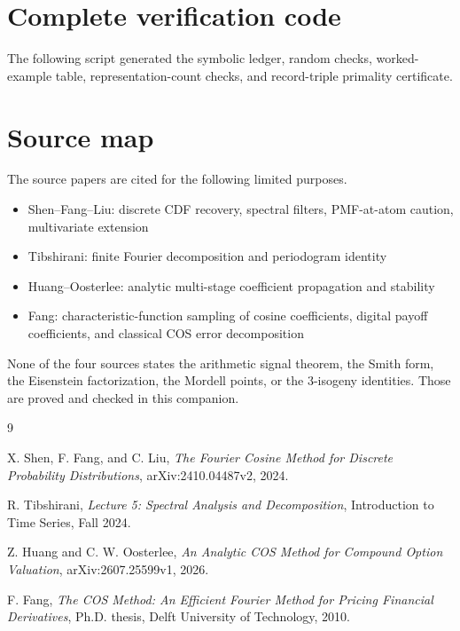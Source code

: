 \documentclass[11pt]{article}
\begin{document}
\section{Complete verification code}

The following script generated the symbolic ledger, random checks, worked-example table, representation-count checks, and record-triple primality certificate.



\section{Source map}

The source papers are cited for the following limited purposes.

\begin{itemize}
  \item Shen--Fang--Liu: discrete CDF recovery, spectral filters, PMF-at-atom caution, multivariate extension
  \item Tibshirani: finite Fourier decomposition and periodogram identity
  \item Huang--Oosterlee: analytic multi-stage coefficient propagation and stability
  \item Fang: characteristic-function sampling of cosine coefficients, digital payoff coefficients, and classical COS error decomposition
\end{itemize}

None of the four sources states the arithmetic signal theorem, the Smith form, the Eisenstein factorization, the Mordell points, or the $3$-isogeny identities.  Those are proved and checked in this companion.

\begin{thebibliography}{9}

X. Shen, F. Fang, and C. Liu,
\emph{The Fourier Cosine Method for Discrete Probability Distributions},
arXiv:2410.04487v2, 2024.

R. Tibshirani,
\emph{Lecture 5: Spectral Analysis and Decomposition},
Introduction to Time Series, Fall 2024.

Z. Huang and C. W. Oosterlee,
\emph{An Analytic COS Method for Compound Option Valuation},
arXiv:2607.25599v1, 2026.

F. Fang,
\emph{The COS Method: An Efficient Fourier Method for Pricing Financial Derivatives},
Ph.D. thesis, Delft University of Technology, 2010.

\end{thebibliography}
\end{document}
